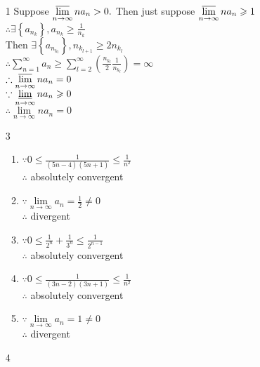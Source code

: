 \begin{enumerate}[1]
	\item[1]
	Suppose \(\varlimsup \limits_{n \rightarrow \infty} na_{n}>0 .\) Then just suppose \( \varlimsup \limits_{n \rightarrow \infty} na_{n} \geqslant 1\)\\
	\(\therefore \exists\left\{a_{n_{k}}\right\}, a_{n_{k}} \geqslant \frac{1}{n_{k}}\)\\
	Then \(\exists\left\{a_{n_{k_{l}}}\right\}, n_{k_{l+1}} \geqslant 2 n_{k_{l}}\)\\
	\(\therefore \sum\limits_{n=1}^{\infty} a_{n} \geqslant \sum\limits_{l=2}^{\infty}\left(\frac{n_{k_{l}}}{2} \frac{1}{n_{k_{l}}}\right)=\infty\)\\
	\(\therefore \varlimsup \limits_{n \rightarrow \infty} n a_{n}=0\)\\
	\(\because \varliminf \limits_{n \rightarrow \infty}  n a_{n} \geqslant 0\)\\
	\(\therefore \lim \limits_{n \rightarrow \infty}  n a_{n}=0\)
	

	\item[3]

\begin{enumerate}[(1)]
	\item 	
	\(\because 0 \leqslant \frac{1}{(5 n-4)(5 n+1)} \leqslant \frac{1}{n^{2}}\)\\
	\(\therefore\) absolutely convergent

	\item 	
	\(\because \lim \limits_{n \rightarrow \infty} a_{n}=\frac{1}{2} \neq 0\)\\
	\(\therefore\) divergent

	\item 	
	\(\because 0 \leqslant \frac{1}{2^{n}}+\frac{1}{3^{n}} \leqslant \frac{1}{2^{n-1}}\)\\
	\(\therefore\) absolutely convergent

	\item 	
	\(\because 0 \leqslant \frac{1}{(3 n-2)(3 n+1)} \leqslant \frac{1}{n^{2}}\)\\
	\(\therefore\) absolutely convergent

	\item 	
	\(\because \lim \limits_{n \rightarrow \infty} a_{n}=1 \neq 0\)\\
	\(\therefore\) divergent


\end{enumerate}

	\item[4]	
	

\end{enumerate}
